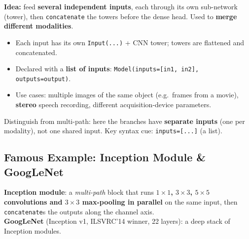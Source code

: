 \documentclass[10pt,a4paper]{article}
\begin{document}
	\begin{definitionbox}
		\textbf{Idea:} feed \textbf{several independent inputs}, each through its own sub-network (tower), then \texttt{concatenate} the towers before the dense head. Used to \textbf{merge different modalities}.
	\end{definitionbox}

	\begin{itemize}[leftmargin=*]
		\item Each input has its own \texttt{Input(...)} + CNN tower; towers are flattened and concatenated.
		\item Declared with a \textbf{list of inputs}: \texttt{Model(inputs=[in1, in2], outputs=output)}.
		\item Use cases: multiple images of the same object (e.g.\ frames from a movie), \textbf{stereo} speech recording, different acquisition-device parameters.
	\end{itemize}

	\begin{examtipbox}
		Distinguish from multi-path: here the branches have \textbf{separate inputs} (one per modality), not one shared input. Key syntax cue: \texttt{inputs=[...]} (a list).
	\end{examtipbox}

	\subsection{Famous Example: Inception Module \& GoogLeNet}

	\begin{definitionbox}
		\textbf{Inception module}: a \emph{multi-path} block that runs \textbf{$1{\times}1$, $3{\times}3$, $5{\times}5$ convolutions and $3{\times}3$ max-pooling in parallel} on the same input, then \texttt{concatenate}s the outputs along the channel axis. \\
		\textbf{GoogLeNet} (Inception v1, ILSVRC'14 winner, 22 layers): a deep stack of Inception modules.
	\end{definitionbox}

	\begin{center}
	\end{center}
\end{document}
